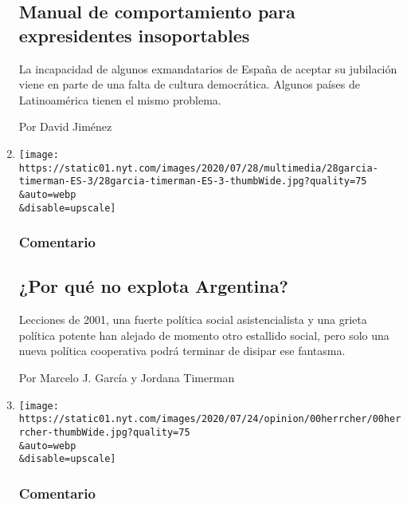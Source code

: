 \begin{enumerate}
{  \subsection{Manual de comportamiento para expresidentes
  insoportables}\label{manual-de-comportamiento-para-expresidentes-insoportables}}

  La incapacidad de algunos exmandatarios de España de aceptar su
  jubilación viene en parte de una falta de cultura democrática. Algunos
  países de Latinoamérica tienen el mismo problema.

  Por David Jiménez
\item
  \href{/es/2020/07/28/espanol/opinion/argentina-estallido-2001-coronavirus.html}{}

  \texttt{[image: https://static01.nyt.com/images/2020/07/28/multimedia/28garcia-timerman-ES-3/28garcia-timerman-ES-3-thumbWide.jpg?quality=75\\\&auto=webp\\\&disable=upscale]}

  \hypertarget{comentario-9}{%
  \subsubsection{Comentario}\label{comentario-9}}

  \hypertarget{por-quuxe9-no-explota-argentina}{%
  \subsection{¿Por qué no explota
  Argentina?}\label{por-quuxe9-no-explota-argentina}}

  Lecciones de 2001, una fuerte política social asistencialista y una
  grieta política potente han alejado de momento otro estallido social,
  pero solo una nueva política cooperativa podrá terminar de disipar ese
  fantasma.

  Por Marcelo J. García y Jordana Timerman
\item
  \href{/es/2020/07/27/espanol/opinion/clases-universidad-coronavirus.html}{}

  \texttt{[image: https://static01.nyt.com/images/2020/07/24/opinion/00herrcher/00herrcher-thumbWide.jpg?quality=75\\\&auto=webp\\\&disable=upscale]}

  \hypertarget{comentario-10}{%
  \subsubsection{Comentario}\label{comentario-10}}

  \hypertarget{las-enseuxf1anzas-de-educar-durante-la-pandemia}{%
}
\end{enumerate}
